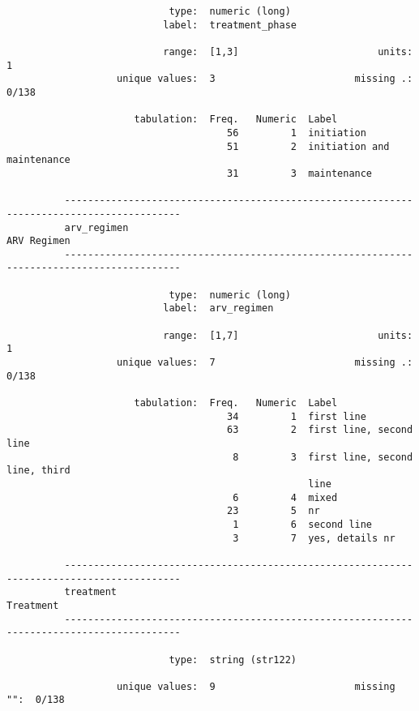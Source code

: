 \documentclass{article}
\begin{document}
\begin{verbatim}
                            type:  numeric (long)
                           label:  treatment_phase
          
                           range:  [1,3]                        units:  1
                   unique values:  3                        missing .:  0/138
          
                      tabulation:  Freq.   Numeric  Label
                                      56         1  initiation
                                      51         2  initiation and maintenance
                                      31         3  maintenance
          
          ------------------------------------------------------------------------------------------
          arv_regimen                                                                    ARV Regimen
          ------------------------------------------------------------------------------------------
          
                            type:  numeric (long)
                           label:  arv_regimen
          
                           range:  [1,7]                        units:  1
                   unique values:  7                        missing .:  0/138
          
                      tabulation:  Freq.   Numeric  Label
                                      34         1  first line
                                      63         2  first line, second line
                                       8         3  first line, second line, third
                                                    line
                                       6         4  mixed
                                      23         5  nr
                                       1         6  second line
                                       3         7  yes, details nr
          
          ------------------------------------------------------------------------------------------
          treatment                                                                        Treatment
          ------------------------------------------------------------------------------------------
          
                            type:  string (str122)
          
                   unique values:  9                        missing "":  0/138
          

\end{verbatim}
\end{document}
